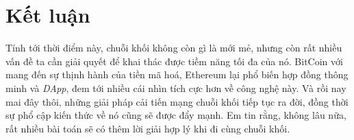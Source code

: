 \chapter*{Kết luận}

Tính tới thời điểm này, chuỗi khối không còn gì là mới mẻ, nhưng còn rất nhiều vấn đề ta cần giải quyết để khai thác được tiềm năng tối đa của nó. BitCoin với mang đến sự thịnh hành của tiền mã hoá, Ethereum lại phổ biến hợp đồng thông minh và \textit{DApp}, đem tới nhiều cái nhìn tích cực hơn về công nghệ này. Và rồi nay mai đây thôi, những giải pháp cải tiến mạng chuỗi khối tiếp tục ra đời, đồng thời sự phổ cập kiến thức về nó cũng sẽ được đẩy mạnh. Em tin rằng, không lâu nữa, rất nhiều bài toán sẽ có thêm lời giải hợp lý khi đi cùng chuỗi khối.
